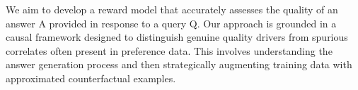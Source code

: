 


\vspace{-0.05in}
We aim to develop a reward model that accurately assesses the quality of an answer $\mathrm{A}$ provided in response to a query $\mathrm{Q}$. Our approach is grounded in a causal framework designed to distinguish genuine quality drivers from spurious correlates often present in preference data. This involves understanding the answer generation process and then strategically augmenting training data with approximated counterfactual examples.

\vspace{-0.05in}
